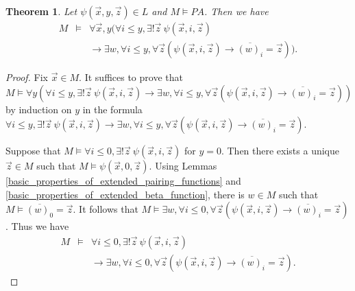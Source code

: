 \documentclass[a4paper,11pt]{article}
\begin{document}
\theoremstyle{plain}
\newtheorem{code_generated_by_formulas}[definition_of_pseudo_M_finiteness]{Theorem}
\begin{code_generated_by_formulas}\label{code_generated_by_formulas}
Let $\psi(\vec{x},y,\vec{z})\in L$ and $M \models PA$. Then we have
\begin{eqnarray*}
  M &\models& \forall \vec{x},y ( \forall i\leq y, \exists!\vec{z}\ \psi(\vec{x},i,\vec{z}) \\
   &&  \rightarrow \exists w, \forall i\leq y, \forall \vec{z} ( \psi(\vec{x},i,\vec{z}) \rightarrow \overline{(w)_i} =  \vec{z} ) ).
\end{eqnarray*}
\end{code_generated_by_formulas}
\begin{proof}
Fix $\vec{x}\in M$. It suffices to prove that $M \models \forall y ( \forall i\leq y, \exists!\vec{z}\ \psi(\vec{x},i,\vec{z}) \rightarrow \exists w, \forall i\leq y, \forall \vec{z} ( \psi(\vec{x},i,\vec{z}) \rightarrow \overline{(w)_i} =  \vec{z} ) )$ by induction on $y$ in the formula $\forall i\leq y, \exists!\vec{z}\ \psi(\vec{x},i,\vec{z}) \rightarrow \exists w, \forall i\leq y, \forall \vec{z} ( \psi(\vec{x},i,\vec{z}) \rightarrow \overline{(w)_i} = \vec{z} )$.

Suppose that $M\models \forall i\leq 0, \exists!\vec{z}\ \psi(\vec{x},i,\vec{z})$ for $y=0$. Then there exists a unique $\vec{z}\in M$ such that $M\models \psi(\vec{x},0,\vec{z})$. Using Lemmas \ref{basic_properties_of_extended_pairing_functions} and \ref{basic_properties_of_extended_beta_function}, there is $w\in M$ such that $M\models \overline{(w)_0} = \vec{z}$. It follows that $M\models \exists w, \forall i\leq 0, \forall \vec{z} ( \psi(\vec{x},i,\vec{z}) \rightarrow \overline{(w)_i} = \vec{z} )$. Thus we have
\begin{eqnarray*}
  M &\models& \forall i\leq 0, \exists!\vec{z}\ \psi(\vec{x},i,\vec{z}) \\
   &&  \rightarrow \exists w, \forall i\leq 0, \forall \vec{z} ( \psi(\vec{x},i,\vec{z}) \rightarrow \overline{(w)_i} = \vec{z} ).
\end{eqnarray*}


\end{proof}
\end{document}
